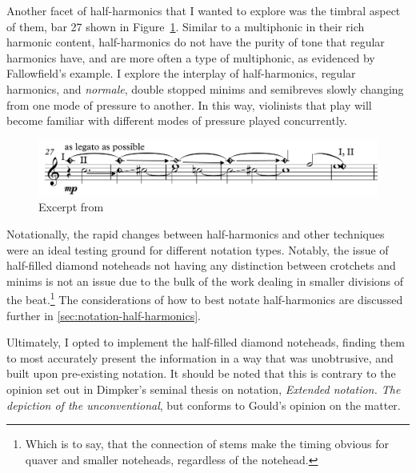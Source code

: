 Another facet of half-harmonics that I wanted to explore was the timbral aspect of them, bar 27 shown in Figure~\ref{fig:violinHalfHarmonicsExcerpt27}.
Similar to a multiphonic in their rich harmonic content, half-harmonics do not have the purity of tone that regular harmonics have, and are more often a type of multiphonic, as evidenced by Fallowfield's example.\autocite[]{fallowfieldCelloMapHalf2013}
I explore the interplay of half-harmonics, regular harmonics, and \emph{normale}, double stopped minims and semibreves slowly changing from one mode of pressure to another.
In this way, violinists that play \violinPiece\space will become familiar with different modes of pressure played concurrently.

\begin{figure}
    \includegraphics[width=\linewidth]{./resources/violinHalfHarmonicsExcerpt27.pdf}
    \caption{Excerpt from \violinPiece}\label{fig:violinHalfHarmonicsExcerpt27}
  \end{figure}

Notationally, the rapid changes between half-harmonics and other techniques were an ideal testing ground for different notation types.
Notably, the issue of half-filled diamond noteheads not having any distinction between crotchets and minims is not an issue due to the bulk of the work dealing in smaller divisions of the beat.\footnote{Which is to say, that the connection of stems make the timing obvious for quaver and smaller noteheads, regardless of the notehead.}
The considerations of how to best notate half-harmonics are discussed further in \autoref{sec:notation-half-harmonics}.

Ultimately, I opted to implement the half-filled diamond noteheads, finding them to most accurately present the information in a way that was unobtrusive, and built upon pre-existing notation.
It should be noted that this is contrary to the opinion set out in Dimpker's seminal thesis on notation, \emph{Extended notation. The depiction of the
unconventional}, but conforms to Gould's opinion on the matter.\autocites[120--121]{dimpkerExtendedNotationDepiction2012}[61]{gouldBars2011}


